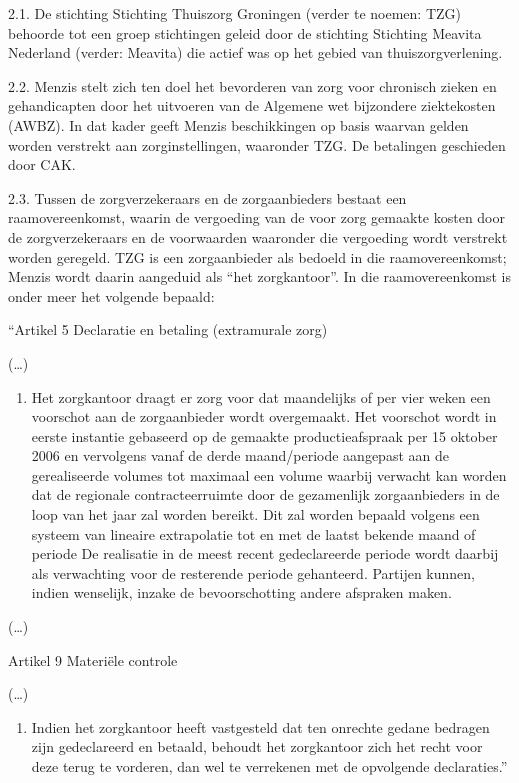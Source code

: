 \documentclass[
  dutch,
  a4paper,
]{article}
\providecommand{\tightlist}{%
  \setlength{\itemsep}{0pt}\setlength{\parskip}{0pt}}
\begin{document}
2.1. De stichting Stichting Thuiszorg Groningen (verder te noemen: TZG) behoorde tot een groep stichtingen geleid door de stichting Stichting Meavita Nederland (verder: Meavita) die actief was op het gebied van thuiszorgverlening.

2.2. Menzis stelt zich ten doel het bevorderen van zorg voor chronisch zieken en gehandicapten door het uitvoeren van de Algemene wet bijzondere ziektekosten (AWBZ). In dat kader geeft Menzis beschikkingen op basis waarvan gelden worden verstrekt aan zorginstellingen, waaronder TZG. De betalingen geschieden door CAK.

2.3. Tussen de zorgverzekeraars en de zorgaanbieders bestaat een raamovereenkomst, waarin de vergoeding van de voor zorg gemaakte kosten door de zorgverzekeraars en de voorwaarden waaronder die vergoeding wordt verstrekt worden geregeld. TZG is een zorgaanbieder als bedoeld in die raamovereenkomst; Menzis wordt daarin aangeduid als ``het zorgkantoor''. In die raamovereenkomst is onder meer het volgende bepaald:

``Artikel 5 Declaratie en betaling (extramurale zorg)

(\ldots)

\begin{enumerate}
\def\labelenumi{\arabic{enumi}.}
\setcounter{enumi}{3}
\tightlist
\item
  Het zorgkantoor draagt er zorg voor dat maandelijks of per vier weken een voorschot aan de zorgaanbieder wordt overgemaakt. Het voorschot wordt in eerste instantie gebaseerd op de gemaakte productieafspraak per 15 oktober 2006 en vervolgens vanaf de derde maand/periode aangepast aan de gerealiseerde volumes tot maximaal een volume waarbij verwacht kan worden dat de regionale contracteerruimte door de gezamenlijk zorgaanbieders in de loop van het jaar zal worden bereikt. Dit zal worden bepaald volgens een systeem van lineaire extrapolatie tot en met de laatst bekende maand of periode De realisatie in de meest recent gedeclareerde periode wordt daarbij als verwachting voor de resterende periode gehanteerd. Partijen kunnen, indien wenselijk, inzake de bevoorschotting andere afspraken maken.
\end{enumerate}

(\ldots)

Artikel 9 Materiële controle

(\ldots)

\begin{enumerate}
\def\labelenumi{\arabic{enumi}.}
\setcounter{enumi}{1}
\tightlist
\item
  Indien het zorgkantoor heeft vastgesteld dat ten onrechte gedane bedragen zijn gedeclareerd en betaald, behoudt het zorgkantoor zich het recht voor deze terug te vorderen, dan wel te verrekenen met de opvolgende declaraties.''
\end{enumerate}
\end{document}
